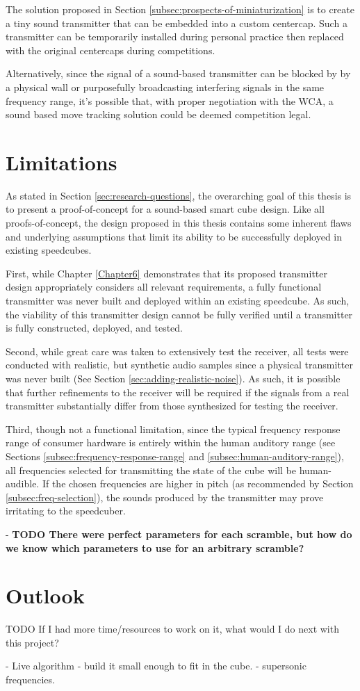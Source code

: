 The solution proposed in Section
\ref{subsec:prospects-of-miniaturization} is to create a tiny sound
transmitter that can be embedded into a custom centercap. Such a
transmitter can be temporarily installed during personal practice then
replaced with the original centercaps during competitions.

Alternatively, since the signal of a sound-based transmitter can be
blocked by by a physical wall or purposefully broadcasting interfering
signals in the same frequency range, it's possible that, with proper
negotiation with the WCA, a sound based move tracking solution could be
deemed competition legal.


\section{Limitations}
\label{sec:limitations}

As stated in Section \ref{sec:research-questions}, the overarching goal
of this thesis is to present a proof-of-concept for a sound-based smart
cube design. Like all proofs-of-concept, the design proposed in this
thesis contains some inherent flaws and underlying assumptions that limit
its ability to be successfully deployed in existing speedcubes.

First, while Chapter \ref{Chapter6} demonstrates that its proposed
transmitter design appropriately considers all relevant requirements, a
fully functional transmitter was never built and deployed within an
existing speedcube. As such, the viability of this transmitter design
cannot be fully verified until a transmitter is fully constructed,
deployed, and tested.

Second, while great care was taken to extensively test the receiver,
all tests were conducted with realistic, but synthetic audio samples
since a physical transmitter was never built (See Section
\ref{sec:adding-realistic-noise}). As such, it is possible that further
refinements to the receiver will be required if the signals from a real
transmitter substantially differ from those synthesized for testing the
receiver.

Third, though not a functional limitation, since the typical frequency
response range of consumer hardware is entirely within the human
auditory range (see Sections \ref{subsec:frequency-response-range} and
\ref{subsec:human-auditory-range}), all frequencies selected for
transmitting the state of the cube will be human-audible. If the chosen
frequencies are higher in pitch (as recommended by Section
\ref{subsec:freq-selection}), the sounds produced by the transmitter
may prove irritating to the speedcuber. 

- \textbf{TODO There were perfect parameters for each scramble, but how do we know which parameters to use for an arbitrary scramble?}


\section{Outlook}
\label{sec:outlook}
TODO If I had more time/resources to work on it, what would I do next
with this project?

- Live algorithm
- build it small enough to fit in the cube.
- supersonic frequencies.